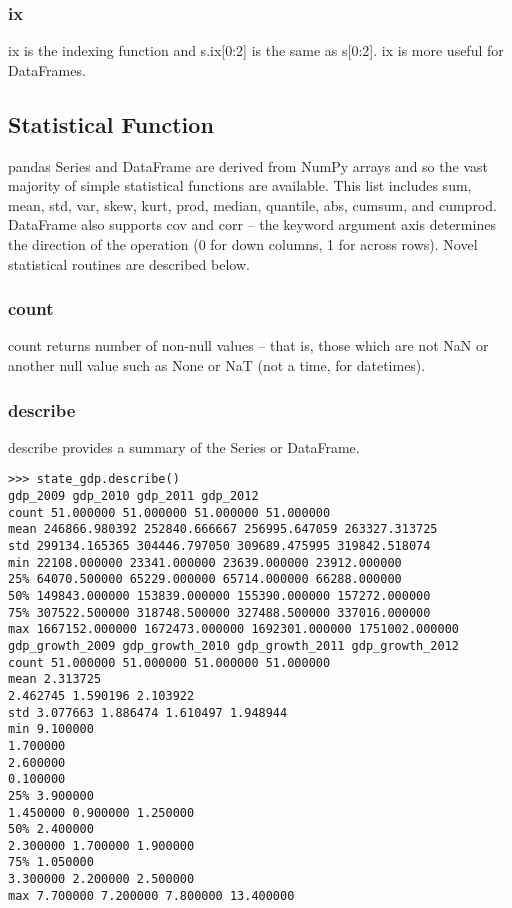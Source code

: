 \documentclass[KSmain.tex]{subfiles}
\begin{document}
\subsubsection{ix}
ix is the indexing function and s.ix[0:2] is the same as s[0:2]. ix is more useful for DataFrames.



\subsection{Statistical Function}
pandas Series and DataFrame are derived from NumPy arrays and so the vast majority of simple statistical
functions are available. This list includes sum, mean, std, var, skew, kurt, prod, median, quantile, abs,
cumsum, and cumprod. DataFrame also supports cov and corr – the keyword argument axis determines the
direction of the operation (0 for down columns, 1 for across rows). Novel statistical routines are described
below.
\subsubsection*{count}
count returns number of non-null values – that is, those which are not NaN or another null value such as
None or NaT (not a time, for datetimes).
\subsubsection*{describe}
describe provides a summary of the Series or DataFrame.
\begin{framed}
\begin{verbatim}
>>> state_gdp.describe()
gdp_2009 gdp_2010 gdp_2011 gdp_2012
count 51.000000 51.000000 51.000000 51.000000
mean 246866.980392 252840.666667 256995.647059 263327.313725
std 299134.165365 304446.797050 309689.475995 319842.518074
min 22108.000000 23341.000000 23639.000000 23912.000000
25% 64070.500000 65229.000000 65714.000000 66288.000000
50% 149843.000000 153839.000000 155390.000000 157272.000000
75% 307522.500000 318748.500000 327488.500000 337016.000000
max 1667152.000000 1672473.000000 1692301.000000 1751002.000000
gdp_growth_2009 gdp_growth_2010 gdp_growth_2011 gdp_growth_2012
count 51.000000 51.000000 51.000000 51.000000
mean 2.313725
2.462745 1.590196 2.103922
std 3.077663 1.886474 1.610497 1.948944
min 9.100000
1.700000
2.600000
0.100000
25% 3.900000
1.450000 0.900000 1.250000
50% 2.400000
2.300000 1.700000 1.900000
75% 1.050000
3.300000 2.200000 2.500000
max 7.700000 7.200000 7.800000 13.400000
\end{verbatim}
\end{framed}
\end{document}
